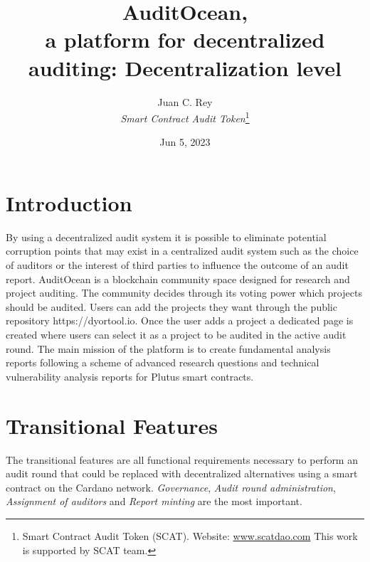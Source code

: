 \documentclass[9pt]{article}
\begin{document}
\title{\textbf{AuditOcean,\\a platform for decentralized auditing: Decentralization level }}
\author{Juan C. Rey\\ \emph{Smart Contract Audit Token}\footnote{Smart Contract Audit Token (SCAT). Website: \url{www.scatdao.com} This work is supported by SCAT team.}\\}
\date{Jun 5, 2023}

\maketitle

\renewcommand*\abstractname{\textbf{}\hfill}


\section{Introduction}
By using a decentralized audit system it is possible to eliminate potential corruption points that may exist in a centralized audit system such as the choice of auditors or the interest of third parties to influence the outcome of an audit report. AuditOcean is a blockchain community space designed for research and project auditing. The community decides through its voting power which projects should be audited. Users can add the projects they want through the public repository https://dyortool.io. Once the user adds a project a dedicated page is created where users can select it as a project to be audited in the active audit round. The main mission of the platform is to create fundamental analysis reports following a scheme of advanced research questions and technical vulnerability analysis reports for Plutus smart contracts.

\section{ Transitional Features }
The transitional features are all functional requirements necessary to perform an audit round that could be replaced with decentralized alternatives using a smart contract on the Cardano network. \emph{Governance}, \emph{Audit round administration}, \emph{Assignment of auditors} and \emph{Report minting} are the most important. 
\end{document}
